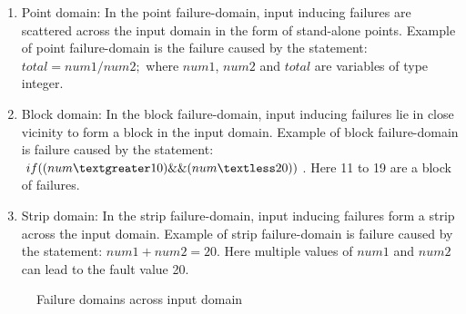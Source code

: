 \begin{enumerate}
\item Point domain: In the point failure-domain, input inducing failures are scattered across the input domain in the form of stand-alone points. Example of point failure-domain is the failure caused by the statement: $total = num1/num2;$ where $num1$, $num2$ and $total$ are variables of type integer.
\item Block domain: In the block failure-domain, input inducing failures lie in close vicinity to form a block in the input domain. Example of block failure-domain is failure caused by the statement: $if ( (num \textgreater 10) \&\& (num \textless 20) )$. Here 11 to 19 are a block of failures.
\item Strip domain: In the strip failure-domain, input inducing failures form a strip across the input domain. Example of strip failure-domain is failure caused by the statement: $num1 + num2 = 20$. Here multiple values of $num1$ and $num2$ can lead to the fault value 20. 
\end{enumerate}
\smallskip
\begin{figure} [H]
\centering
{}
\bigskip

\caption{Failure domains across input domain~\cite{chan1996proportional}}
\label{fig:patterns2}
\end{figure}

